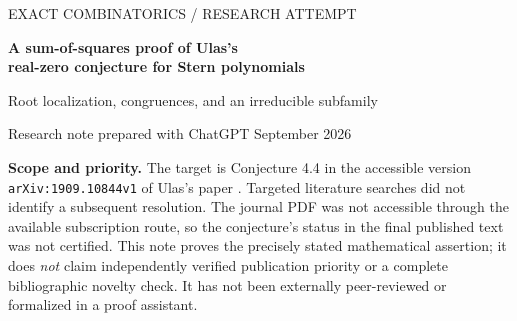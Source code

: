 \documentclass[11pt]{article}
\numberwithin{equation}{section}
\theoremstyle{definition}
\newcommand{\Q}{\mathbb Q}
\newcommand{\Repart}{\operatorname{Re}}
\begin{document}
\thispagestyle{empty}
\begin{center}
 {\small\sffamily\color{accent} EXACT COMBINATORICS \quad / \quad RESEARCH ATTEMPT}\par
 \vspace{9pt}
 {\LARGE\bfseries\color{ink} A sum-of-squares proof of Ulas's\\[4pt]
 real-zero conjecture for Stern polynomials}\par
 \vspace{9pt}
 {\large Root localization, congruences, and an irreducible subfamily}\par
 \vspace{10pt}
 {Research note prepared with ChatGPT\quad\textbullet{} September 2026}
\end{center}
\vspace{4pt}
\begin{abstract}
For the Stern polynomials defined by $B_0=0$, $B_1=1$,
$B_{2m}=tB_m$ and $B_{2m+1}=B_m+B_{m+1}$, Ulas formulated a conjecture that
$B_{h_n}$ has no real zeros, where
$h_n=\frac23(4^n-1)(2\cdot4^n+1)+1$.
We prove this statement by exhibiting an exact positive-definite quadratic
form in two consecutive auxiliary polynomials.  The identity is obtained
independently from the defining Stern recurrence, and the argument includes
the exceptional parameter $t=0$.
A tridiagonal-matrix representation then places every zero strictly to the
left of $\Repart t=-1/4$.  Further consequences are a rational generating
function, an exact formula for the degree after reduction modulo three,
and irreducibility over $\Q$ whenever $2n+1$ is a power of three.
For each fixed positive integer $j$, we also construct a conjugate pair of
zeros with real part of order $-n^2/(j^2\pi^2)$ and imaginary part of order
$\pm\sqrt3 n/(j^2\pi^2)$.
All universal claims are proved analytically.  A separate, dependency-free
program supplies 6,722 exact checks; numerical illustrations are explicitly
non-certifying.
\end{abstract}

\begin{statusbox}
\textbf{Scope and priority.}
The target is Conjecture 4.4 in the accessible version
\texttt{arXiv:1909.10844v1} of Ulas's paper \cite{Ulas}.
Targeted literature searches did not identify a subsequent resolution.
The journal PDF was not accessible through the available subscription route,
so the conjecture's status in the final published text was not certified.
This note proves the precisely stated mathematical assertion; it does
\emph{not} claim independently verified publication priority or a complete
bibliographic novelty check.  It has not been externally peer-reviewed or
formalized in a proof assistant.
\end{statusbox}
\end{document}
